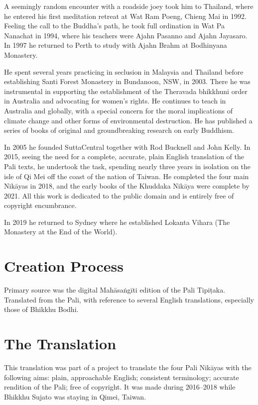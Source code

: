 \documentclass[12pt,openany]{book}%
\begin{document}
A seemingly random encounter with a roadside joey took him to Thailand, where he entered his first meditation retreat at Wat Ram Poeng, Chieng Mai in 1992. Feeling the call to the Buddha’s path, he took full ordination in Wat Pa Nanachat in 1994, where his teachers were Ajahn Pasanno and Ajahn Jayasaro. In 1997 he returned to Perth to study with Ajahn Brahm at Bodhinyana Monastery. 

He spent several years practicing in seclusion in Malaysia and Thailand before establishing Santi Forest Monastery in Bundanoon, NSW, in 2003. There he was instrumental in supporting the establishment of the Theravada bhikkhuni order in Australia and advocating for women’s rights. He continues to teach in Australia and globally, with a special concern for the moral implications of climate change and other forms of environmental destruction. He has published a series of books of original and groundbreaking research on early Buddhism. 

In 2005 he founded SuttaCentral together with Rod Bucknell and John Kelly. In 2015, seeing the need for a complete, accurate, plain English translation of the Pali texts, he undertook the task, spending nearly three years in isolation on the isle of Qi Mei off the coast of the nation of Taiwan. He completed the four main \textsanskrit{Nikāyas} in 2018, and the early books of the Khuddaka \textsanskrit{Nikāya} were complete by 2021. All this work is dedicated to the public domain and is entirely free of copyright encumbrance. 

In 2019 he returned to Sydney where he established Lokanta Vihara (The Monastery at the End of the World). 

\section*{Creation Process}

Primary source was the digital \textsanskrit{Mahāsaṅgīti} edition of the Pali \textsanskrit{Tipiṭaka}. Translated from the Pali, with reference to several English translations, especially those of Bhikkhu Bodhi.

\section*{The Translation}

This translation was part of a project to translate the four Pali \textsanskrit{Nikāyas} with the following aims: plain, approachable English; consistent terminology; accurate rendition of the Pali; free of copyright. It was made during 2016–2018 while Bhikkhu Sujato was staying in Qimei, Taiwan.
\end{document}
